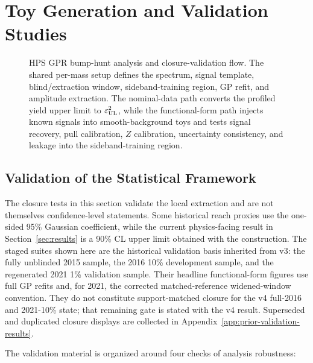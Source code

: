\section{Toy Generation and Validation Studies}
\label{sec:toys}

\begin{figure}[H]
\centering
{}
\caption{HPS GPR bump-hunt analysis and closure-validation flow. The shared
per-mass setup defines the spectrum, signal template, blind/extraction window,
sideband-training region, GP refit, and amplitude extraction. The nominal-data path
converts the profiled yield upper limit to $\varepsilon^2_{\mathrm{UL}}$, while the
functional-form path injects known signals into smooth-background toys and tests signal
recovery, pull calibration, $Z$ calibration, uncertainty consistency, and leakage into
the sideband-training region.}
\label{fig:hps-gpr-flowchart-section5}
\end{figure}

\subsection{Validation of the Statistical Framework}

The closure tests in this section validate the local extraction and are not themselves
confidence-level statements. Some historical reach proxies use the one-sided 95\%
Gaussian coefficient, while the current physics-facing result in
Section~\ref{sec:results} is a 90\% CL upper limit obtained with the \CLs{} construction.
The staged suites shown here are the historical validation basis inherited from v3:
the fully unblinded 2015 sample, the 2016 10\% development sample, and the regenerated
2021 1\% validation sample. Their headline functional-form figures use full GP refits
and, for 2021, the corrected matched-reference widened-window convention. They do not
constitute support-matched closure for the v4 full-2016 and 2021-10\% state; that
remaining gate is stated with the v4 result. Superseded and duplicated closure
displays are collected in Appendix~\ref{app:prior-validation-results}.

The validation material is organized around four checks of analysis robustness:

